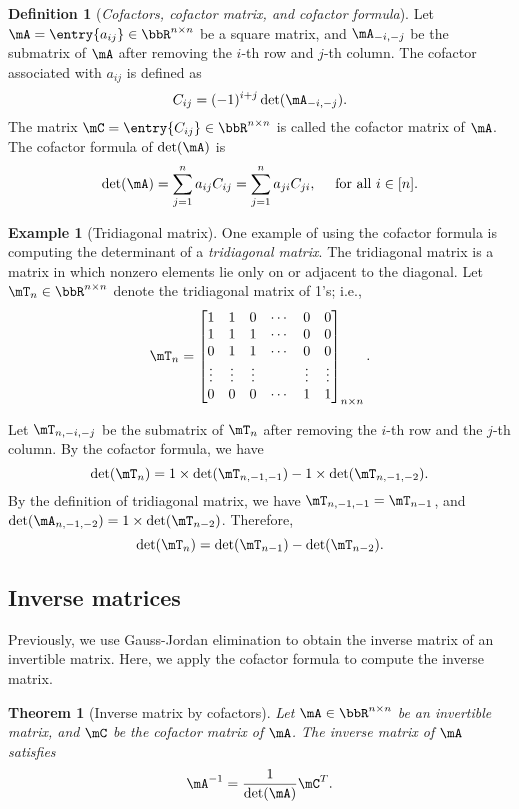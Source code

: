\documentclass[11pt]{article}
\theoremstyle{plain}
\newtheorem{thm}{Theorem}[section]
\theoremstyle{definition}
\newtheorem{defn}{Definition}
\newtheorem{example}{Example}
\begin{document}
\begin{defn}[\textit{Cofactors, cofactor matrix, and cofactor formula}]
	Let $\mA=  \entry{a_{ij}} \in \bbR^{n \times n}$ be a square matrix, and $\mA_{-i,-j}$ be the submatrix of $\mA$ after removing the $i$-th row and $j$-th column. The cofactor associated with $a_{ij}$ is defined as \[C_{ij} = (-1)^{i+j}\det(\mA_{-i,-j}).\]
	The matrix $\mC = \entry{C_{ij}} \in \bbR^{n \times n}$ is called the cofactor matrix of $\mA$.  The cofactor formula of $\det(\mA)$ is
	\[ \det(\mA) = \sum_{j=1}^n a_{ij} C_{ij} = \sum_{j=1}^n a_{ji} C_{ji} ,\quad \text{ for all } i \in [n].  \]
\end{defn}

\begin{example}[Tridiagonal matrix]
	One example of using the cofactor formula is computing the determinant of a \textit{tridiagonal matrix}. The tridiagonal matrix is a matrix in which nonzero elements lie only on or adjacent to the diagonal. Let $\mT_n \in \bbR^{n \times n}$ denote the tridiagonal matrix of 1's; i.e.,
\begin{align}
	\mT_n = \begin{bmatrix}
		1 &1&0 &\cdots & 0 &0\\
		1&1&1&\cdots &0&0\\
		0&1&1&\cdots &0&0\\
		\vdots &\vdots &\vdots &&\vdots &\vdots \\
		0&0&0&\cdots&1&1
	\end{bmatrix}_{n \times n}.
\end{align} 

Let $\mT_{n, -i,-j}$ be the submatrix of  $\mT_n$ after removing the $i$-th row and the $j$-th column.   By the cofactor formula, we have
\[  \det(\mT_n) = 1 \times \det(\mT_{n, -1,-1}) - 1 \times \det(\mT_{n,-1,-2}). \]
By the definition of tridiagonal matrix, we have $\mT_{n,-1,-1} = \mT_{n-1}$, and $\det( \mA_{n,-1,-2}) = 1 \times \det(\mT_{n-2}) $. Therefore, 
\[ \det(\mT_n) = \det(\mT_{n-1}) - \det(\mT_{n-2}).  \] 
\end{example}

\subsection{Inverse matrices}
Previously, we use Gauss-Jordan elimination to obtain the inverse matrix of an invertible matrix. Here, we apply the cofactor formula to compute the inverse matrix.

\begin{thm}[Inverse matrix by cofactors]\label{thm:inver}
Let $\mA \in \bbR^{n \times n}$ be an invertible matrix, and $\mC$ be the cofactor matrix of $\mA$. The inverse matrix of $\mA$ satisfies
\[  \mA^{-1} = \frac{1}{\det(\mA)} \mC^T. \]	
\end{thm}
\end{document}
